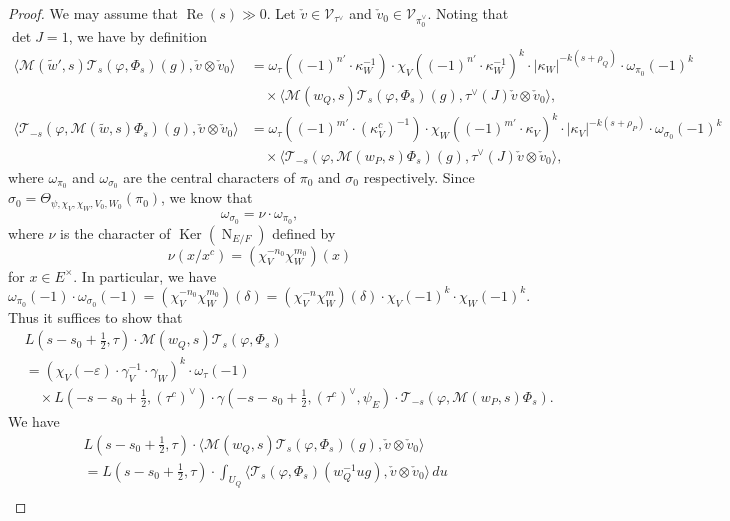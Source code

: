 \documentclass[11pt]{amsart}
\numberwithin{equation}{section}
\theoremstyle{plain}
\theoremstyle{definition}
\theoremstyle{remark}
\def\Ker{\operatorname{Ker}}
\def\N{\operatorname{N}}
\def\Re{\operatorname{Re}}
\def\M{\mathcal{M}}
\def\T{\mathcal{T}}
\def\V{\mathscr{V}}
\begin{document}
\begin{proof}
We may assume that $\Re(s) \gg 0$.
Let $\check{v} \in \V_{\tau^\vee}$ and $\check{v}_0 \in \V_{\pi_0^\vee}$.
Noting that $\det J = 1$, we have by definition
\begin{align*}
 \langle \M(\tilde{w}', s) \T_s(\varphi, \Phi_s)(g), \check{v} \otimes \check{v}_0 \rangle
 & = \omega_\tau((-1)^{n'} \cdot \kappa_W^{-1}) \cdot 
 \chi_V((-1)^{n'} \cdot \kappa_W^{-1})^k
 \cdot |\kappa_W|^{-k(s+\rho_Q)} \cdot \omega_{\pi_0}(-1)^k \\
 & \quad \times \langle \M(w_Q, s) \T_s(\varphi, \Phi_s)(g), \tau^\vee(J) \check{v} \otimes \check{v}_0 \rangle, \\
 \langle \T_{-s}(\varphi, \M(\tilde{w}, s) \Phi_s)(g), \check{v} \otimes \check{v}_0 \rangle
 & = \omega_\tau((-1)^{m'} \cdot (\kappa_V^c)^{-1})
 \cdot \chi_W((-1)^{m'} \cdot \kappa_V)^k
 \cdot |\kappa_V|^{-k(s+\rho_P)} \cdot \omega_{\sigma_0}(-1)^k \\
 & \quad \times \langle \T_{-s}(\varphi, \M(w_P, s) \Phi_s)(g), \tau^\vee(J) \check{v} \otimes \check{v}_0 \rangle,
\end{align*}
where $\omega_{\pi_0}$ and $\omega_{\sigma_0}$ are the central characters of $\pi_0$ and $\sigma_0$ respectively.
Since $\sigma_0 =\Theta_{\psi, \chi_V, \chi_W, V_0, W_0}(\pi_0)$, we know that 
\[
 \omega_{\sigma_0} = \nu \cdot \omega_{\pi_0}, 
\]
where $\nu$ is the character of $\Ker(\N_{E/F})$ defined by 
\[
 \nu(x/x^c) = (\chi_V^{-n_0} \chi_W^{m_0})(x)
\]
for $x \in E^{\times}$.
In particular, we have
\[
 \omega_{\pi_0}(-1) \cdot \omega_{\sigma_0}(-1) = 
 (\chi_V^{-n_0} \chi_W^{m_0})(\delta)
 = (\chi_V^{-n} \chi_W^{m})(\delta) \cdot \chi_V(-1)^k \cdot \chi_W(-1)^k.
\]
Thus it suffices to show that
\begin{align*}
 & L(s-s_0+\tfrac{1}{2}, \tau) \cdot \M(w_Q, s) \T_s(\varphi, \Phi_s) \\
 & = (\chi_V(-\varepsilon) \cdot \gamma_V^{-1} \cdot \gamma_W)^k \cdot \omega_{\tau}(-1) \\
 & \quad \times L(-s-s_0+\tfrac{1}{2}, (\tau^c)^\vee)  \cdot \gamma(-s-s_0+\tfrac{1}{2}, (\tau^c)^\vee, \psi_E) \cdot  \T_{-s}(\varphi, \M(w_P, s) \Phi_s).
\end{align*}
We have
\begin{align*}
 & L(s - s_0 + \tfrac{1}{2}, \tau) \cdot 
 \langle \M(w_Q, s) \T_s(\varphi, \Phi_s)(g), \check{v} \otimes \check{v}_0 \rangle \\
 & = L(s - s_0 + \tfrac{1}{2}, \tau) \cdot 
 \int_{U_Q} \langle \T_s(\varphi, \Phi_s)(w_Q^{-1} u g), \check{v} \otimes \check{v}_0 \rangle \, du \\

\end{align*}
\end{proof}
\end{document}
